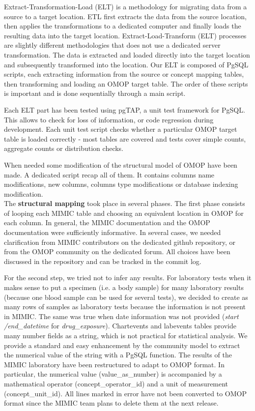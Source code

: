 Extract-Transformation-Load (ELT) is a methodology for migrating data from a 
source to a target location. ETL first extracts the data from the source location, 
then applies the transformations to a dedicated computer and finally loads the 
resulting data into the target location. Extract-Load-Transform (ELT) processes 
are slightly different methodologies that does not use a dedicated server 
transformation. The data is extracted and loaded directly into the target location 
and subsequently transformed into the location.
Our ELT is composed of PgSQL scripts, each extracting information from the source 
or concept mapping tables, then transforming and loading an OMOP target table. 
The order of these scripts is important and is done sequentially through a main 
script.

Each ELT part has been tested using pgTAP, a unit test framework for PgSQL.
This allows to check for loss of information, or code regression during
development. Each unit test script checks whether a particular OMOP target
table is loaded correctly - most tables are covered and tests cover simple
counts, aggregate counts or distribution checks.

When needed some modification of the structural model of OMOP have been made. A
dedicated script recap all of them. It contains columns name modifications, new
columns, columns type modifications or database indexing modification.
~
\\

The \textbf{structural mapping} took place in several phases.
The first phase consists of looping each MIMIC table and choosing an equivalent 
location in OMOP for each column. In general, the MIMIC documentation and the OMOP 
documentation were sufficiently informative. In several cases, we needed 
clarification from MIMIC contributors on the dedicated github repository, or from 
the OMOP community on the dedicated forum. All choices have been discussed in the 
repository \cite{mimic-omop-github} and can be tracked in the commit log.

For the second step, we tried not to infer any results. For laboratory tests when 
it makes sense to put a specimen (i.e. a body sample) for many laboratory results 
(because one blood sample can be used for several tests), we decided to create as 
many rows of samples as laboratory tests because the information is not present 
in MIMIC. The same was true when date information was not provided (\textit{start
/end\_datetime} for \textit{drug\_exposure}).
Chartevents and labevents tables provide many number fields as a string, which is 
not practical for statistical analysis. We provide a standard and easy enhancement 
by the community model to extract the numerical value of the string with a PgSQL 
function. The results of the MIMIC laboratory have been restructured to adapt to 
OMOP format. In particular, the numerical value (value\_as\_number) is accompanied 
by a mathematical operator (concept\_operator\_id) and a unit of measurement 
(concept\_unit\_id). All lines marked in error have not been converted to OMOP 
format since the MIMIC team plans to delete them at the next release.

